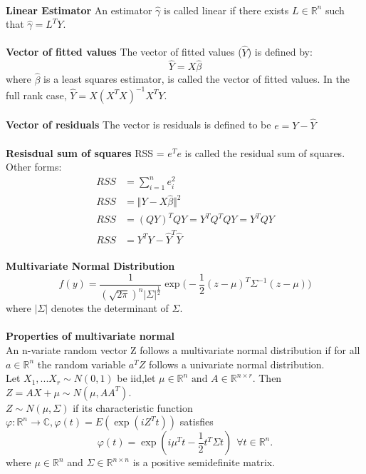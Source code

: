 \documentclass{article}
\begin{document}
\\
\textbf{Linear Estimator}
An estimator $\hat{\gamma}$ is called linear if there exists $L \in \mathbb{R}^n$ such that $\hat{\gamma} = L^TY.$
\\
\\
\textbf{Vector of fitted values} The vector of fitted values ($\hat{Y}$) is defined by:
$$\hat{Y} = X \hat{\beta}$$where $\hat{\beta}$ is a least squares estimator, is called the vector of fitted values. In the full rank case, $\hat{Y} = X(X^TX)^{-1}X^TY$.
\\
\\
\textbf{Vector of residuals} The vector is residuals is defined to be
$e = Y - \hat{Y}$ 
\\
\\
\textbf{Resisdual sum of squares} RSS = $e^T e$ is called the residual sum of squares. \\
Other forms:
\begin{align*}
    RSS &= \sum_{i=1}^n e_i^2\\
    RSS &= \Vert Y - X\hat{\beta}\Vert^2 \\
    RSS &= (QY)^TQY = Y^TQ^TQY = Y^TQY \\
    RSS &= Y^TY - \hat{Y}^T\hat{Y}
\end{align*}
\\
\textbf{Multivariate Normal Distribution}
$$
f(y) = \frac{1}{(\sqrt{2\pi})^n|\Sigma|^{\frac{1}{2}}} \exp \big ( -\frac{1}{2}(z - \mu)^T\Sigma^{-1}(z - \mu) \big )
$$ where $|\Sigma |$ denotes the determinant of $\Sigma$.
\\
\\
\textbf{Properties of multivariate normal} \\
An n-variate random vector Z follows a multivariate normal distribution if for all $ a \in \mathbb{R}^n $ the random variable $ a^T Z $ follows a univariate normal distribution. \\
Let $X_1,...X_r \sim N(0,1)$ be iid,let $\mu \in \mathbb{R}^n \text{ and } A \in \mathbb{R}^{n \times r}$. Then $Z = AX+ \mu \sim N(\mu,AA^T) $. \\
$Z \sim N (\mu, \Sigma)$ if its characteristic function $\varphi: \mathbb{R}^n \to \mathbb{C}, \varphi(t) = E(\exp(i Z^T t))$ satisfies $$\varphi(t) = \exp (i\mu^Tt - \frac{1}{2}t^T\Sigma t )\hspace{5pt}\forall t \in \mathbb{R}^n.$$
where $\mu \in \mathbb{R}^n$ and $\Sigma \in \mathbb{R}^{n \times n}$ is a positive semidefinite matrix.
\\
\\
\end{document}
